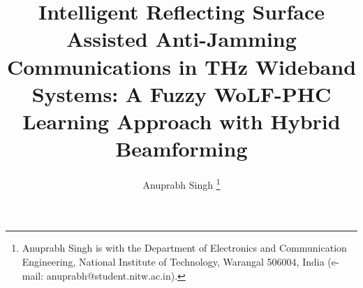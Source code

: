 \documentclass[journal,twocolumn]{IEEEtran}
\begin{document}

\title{Intelligent Reflecting Surface Assisted Anti-Jamming Communications in THz Wideband Systems: A Fuzzy WoLF-PHC Learning Approach with Hybrid Beamforming}

\author{Anuprabh Singh%
\thanks{Anuprabh Singh is with the Department of Electronics and Communication Engineering, National Institute of Technology, Warangal 506004, India (e-mail: anuprabh@student.nitw.ac.in).}}

\maketitle

\end{document}
